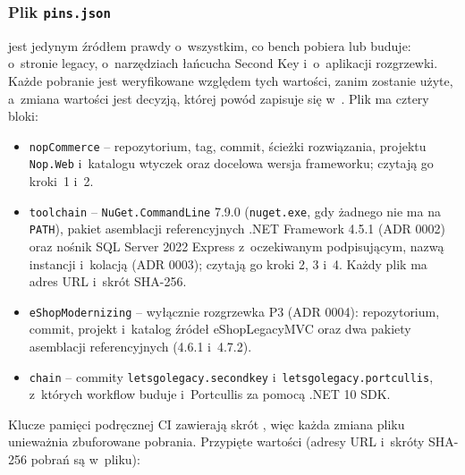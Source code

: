 
\subsubsection{Plik \texttt{pins.json}}\label{sec:bench-pins}

 jest jedynym źródłem prawdy o~wszystkim, co bench pobiera lub buduje:
o~stronie legacy, o~narzędziach łańcucha Second Key i~o~aplikacji rozgrzewki. Każde
pobranie jest weryfikowane względem tych wartości, zanim zostanie użyte, a~zmiana wartości
jest decyzją, której powód zapisuje się w~. Plik ma cztery bloki:

\begin{itemize}
  \item \texttt{nopCommerce} -- repozytorium, tag, commit, ścieżki rozwiązania, projektu
    \texttt{Nop.Web} i~katalogu wtyczek oraz docelowa wersja frameworku; czytają go kroki~1
    i~2.
  \item \texttt{toolchain} -- \texttt{NuGet.CommandLine} 7.9.0 (\texttt{nuget.exe}, gdy
    żadnego nie ma na \texttt{PATH}), pakiet asemblacji referencyjnych .NET Framework 4.5.1
    (ADR 0002) oraz nośnik SQL Server 2022 Express z~oczekiwanym podpisującym,
    nazwą instancji i~kolacją (ADR 0003); czytają go kroki 2, 3 i~4. Każdy plik ma adres
    URL i~skrót SHA-256.
  \item \texttt{eShopModernizing} -- wyłącznie rozgrzewka P3 (ADR 0004): repozytorium,
    commit, projekt i~katalog źródeł eShopLegacyMVC oraz dwa pakiety asemblacji
    referencyjnych (4.6.1 i~4.7.2).
  \item \texttt{chain} -- commity \texttt{letsgolegacy.secondkey} i~\texttt{letsgolegacy.portcullis},
    z~których workflow  buduje  i~Portcullis za pomocą
    .NET 10 SDK.
\end{itemize}

Klucze pamięci podręcznej CI zawierają skrót , więc każda zmiana
pliku unieważnia zbuforowane pobrania. Przypięte wartości (adresy URL i~skróty SHA-256 pobrań są
w~pliku):

